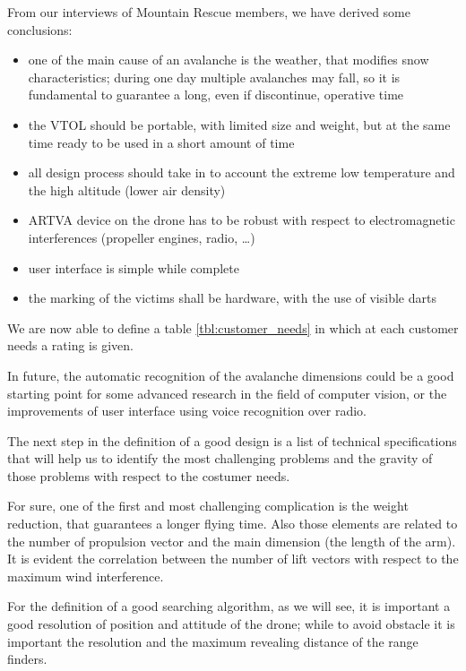 From our interviews of Mountain Rescue members, we have derived some conclusions:
\begin{itemize}
\item one of the main cause of an avalanche is the weather, that modifies snow characteristics; during one day multiple avalanches may fall, so it is fundamental to guarantee a long, even if discontinue, operative time
\item the VTOL should be portable, with limited size and weight, but at the same time ready to be used in a short amount of time
\item all design process should take in to account the extreme low temperature and the high altitude (lower air density)
\item ARTVA device on the drone has to be robust with respect to electromagnetic interferences (propeller engines, radio, \dots)
\item user interface is simple while complete
\item the marking of the victims shall be hardware, with the use of visible darts
\end{itemize}


We are now able to define a table \ref{tbl:customer_needs} in which at each customer needs a rating is given.

In future, the automatic recognition of the avalanche dimensions could be a good starting point for some advanced research in the field of computer vision, or the improvements of user interface using voice recognition over radio.

The next step in the definition of a good design is a list of technical specifications that will help us to identify the most challenging problems and the gravity of those problems with respect to the costumer needs.

For sure, one of the first and most challenging complication is the weight reduction, that guarantees a longer flying time. Also those elements are related to the number of  propulsion vector and the main dimension (the length of the arm). It is evident the correlation between the number of lift vectors with respect to the maximum wind interference.

For the definition of a good searching algorithm, as we will see, it is important a good resolution of position and attitude of the drone; while to avoid obstacle it is important the resolution and the maximum revealing distance of the range finders.

